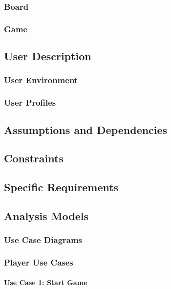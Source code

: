 \documentclass[12pt, a4paper]{article}
\begin{document}
		\subsubsection{Board}
		
		\subsubsection{Game}
		
	\subsection{User Description}
	
		\subsubsection{User Environment}
		
		\subsubsection{User Profiles}
		
	\subsection{Assumptions and Dependencies}
	
	\subsection{Constraints}
	
	\subsection{Specific Requirements}
	
	\subsection{Analysis Models}
	
		\subsubsection{Use Case Diagrams}
		
		\subsubsection{Player Use Cases}
			\paragraph{Use Case 1: Start Game }
			
\end{document}
